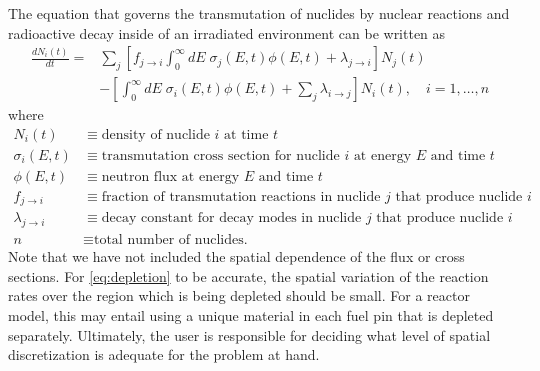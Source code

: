 \documentclass[3p,authoryear]{elsarticle}
\begin{document}
The equation that governs the transmutation of nuclides by nuclear reactions and
radioactive decay inside of an irradiated environment can be written as
\begin{equation}
  \label{eq:depletion}
  \begin{split}
  \frac{dN_i(t)}{dt} = &\sum\limits_j \left [ f_{j \rightarrow i}
  \int_0^\infty dE \; \sigma_j (E, t) \phi(E,t) + \lambda_{j\rightarrow i}
  \right ] N_j(t) \\ &- \left [\int_0^\infty dE \; \sigma_i (E,t) \phi(E,t) +
  \sum\limits_j \lambda_{i\rightarrow j} \right ] N_i(t), \quad i=1,\dots,n
  \end{split}
\end{equation}
where
\begin{equation*}
  \begin{split}
  N_i(t) &\equiv \text{density of nuclide $i$ at time $t$} \\
  \sigma_i(E,t) &\equiv \text{transmutation cross section for nuclide $i$ at energy $E$ and time $t$} \\
  \phi(E,t) &\equiv \text{neutron flux at energy $E$ and time $t$} \\
  f_{j \rightarrow i} &\equiv \text{fraction of transmutation reactions in nuclide $j$ that produce nuclide $i$} \\
  \lambda_{j \rightarrow i} &\equiv \text{decay constant for decay modes in nuclide $j$ that produce nuclide $i$} \\
  n &\equiv \text{total number of nuclides.}
  \end{split}
\end{equation*}
Note that we have not included the spatial dependence of the flux or cross
sections. For \cref{eq:depletion} to be accurate, the spatial variation of the
reaction rates over the region which is being depleted should be small. For a
reactor model, this may entail using a unique material in each fuel pin that is
depleted separately. Ultimately, the user is responsible for deciding what level
of spatial discretization is adequate for the problem at hand.
\end{document}
